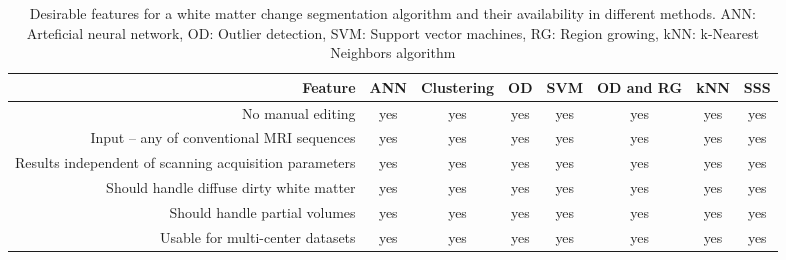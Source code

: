 \begin{table}
\centering
    \begin{tabular}  {  r | c c c c c c c }
        Feature & ANN \newline \cite{Zijdenbos_2002} & Clustering \newline \cite{LesionTOADS_2010} & OD \newline \cite{OutlierLocalIntensity_2011} & SVM \newline \cite{CascadeOrig} & OD and RG \newline \cite{LesionSegmentationToolbox_2012} & kNN\newline\cite{kNN-TTPs_2013} & SSS \newline \cite{Rotation-invariant_2015} \\
    \hline %
        No manual editing                                      & yes & yes & yes & yes & yes & yes & yes \\ 
        Input – any of conventional MRI sequences              & yes & yes & yes & yes & yes & yes & yes \\ 
        Results independent of scanning acquisition parameters & yes & yes & yes & yes & yes & yes & yes \\ 
        Should handle diffuse dirty white matter               & yes & yes & yes & yes & yes & yes & yes \\ 
        Should handle partial volumes                          & yes & yes & yes & yes & yes & yes & yes \\ 
        Usable for multi-center datasets                       & yes & yes & yes & yes & yes & yes & yes \\ 
    \hline
    \end{tabular} 
    \caption{Desirable features for a white matter change segmentation algorithm and their availability in different methods. ANN: Arteficial neural network, OD: Outlier detection, SVM: Support vector machines, RG: Region growing, kNN: k-Nearest Neighbors algorithm} 
    \label{Table:Other_Methods}
\end{table}
  
  
  
  
  
  